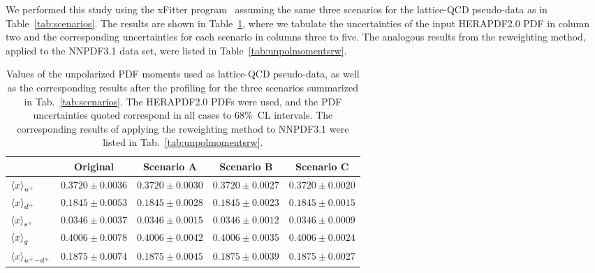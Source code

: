 We performed this study using the xFitter program~\cite{Alekhin:2014irh}
assuming the same three scenarios for the lattice-QCD pseudo-data as 
in Table~\ref{tab:scenarios}. 
%
The results are shown in Table~\ref{tab:unpolmomentsProf}, where we tabulate 
the uncertainties of the input HERAPDF2.0 PDF in column two and the 
corresponding uncertainties for each scenario in columns three to five. 
%
The analogous results from the reweighting method, applied to the 
NNPDF3.1 data set, were listed in Table~\ref{tab:unpolmomentsrw}.

\begin{table}[!t]
\centering
\footnotesize
\renewcommand{\arraystretch}{1.3} 
\begin{tabular}{lcccc}
\toprule 
&  Original  & Scenario A  &  Scenario B  &  Scenario C  \\
\midrule
  $\left\langle x\right\rangle_{u^+}$     
&  $0.3720\pm 0.0036$  
&  $0.3720\pm 0.0030$  
&  $0.3720\pm 0.0027$  
&  $0.3720\pm 0.0020$ \\
  $\left\langle x\right\rangle_{d^+}$     
&  $0.1845\pm 0.0053$  
&  $0.1845\pm 0.0028$  
&  $0.1845\pm 0.0023$  
&  $0.1845\pm 0.0015$ \\
  $\left\langle x\right\rangle_{s^+}$     
&  $0.0346\pm 0.0037$  
&  $0.0346\pm 0.0015$  
&  $0.0346\pm 0.0012$  
&  $0.0346\pm 0.0009$ \\
  $\left\langle x\right\rangle_{g}$       
&  $0.4006\pm 0.0078$  
&  $0.4006\pm 0.0042$  
&  $0.4006\pm 0.0035$  
&  $0.4006\pm 0.0024$ \\
  $\left\langle x\right\rangle_{u^+-d^+}$ 
&  $0.1875\pm 0.0074$  
&  $0.1875\pm 0.0045$  
&  $0.1875\pm 0.0039$  
&  $0.1875\pm 0.0027$ \\
\bottomrule
\end{tabular}
\caption{\small Values of the unpolarized PDF moments
  used as lattice-QCD pseudo-data, as well as the corresponding results
  after the profiling  for the
three scenarios summarized in Tab.~\ref{tab:scenarios}.
%
The HERAPDF2.0 PDFs were used, and the PDF uncertainties quoted correspond in all cases to 68\%~CL intervals.
%
The corresponding results of applying the reweighting method
to NNPDF3.1 were listed in Tab.~\ref{tab:unpolmomentsrw}.
\label{tab:unpolmomentsProf}
}
\end{table}

